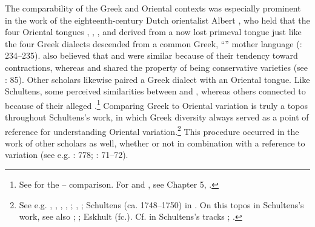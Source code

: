 The comparability of the Greek and Oriental contexts was especially prominent in the work of the eighteenth-century Dutch orientalist Albert \citeauthor{Schultens1739}, who held that the four Oriental tongues , , , and  derived from a now lost primeval tongue just like the four Greek dialects descended from a common Greek, “” mother language (\citeyear{Schultens1739}: 234–235). \citet[\textsc{xcvi}]{Schultens1748} also believed that  and  were similar because of their tendency toward contractions, whereas  and  shared the property of being conservative varieties (see \citealt{Eskhult2015}: 85). Other scholars likewise paired a Greek dialect with an Oriental tongue. Like Schultens, some perceived similarities between  and , whereas others connected  to  because of their alleged .\footnote{See \citet[425--432]{Lakemacher1730} for the – comparison. For  and  , see Chapter 5, .} Comparing Greek to Oriental variation is truly a topos throughout Schultens’s work, in which Greek diversity always served as a point of reference for understanding Oriental variation.\footnote{See e.g. \citet[490]{Schultens1769}, \citet[4]{Schultens1732}, \citet[5]{Schultens1737}, \citet[19--21]{Schultens1738a}, \citet[106--107, stressing that the Oriental and the  contexts were less comparable]{Schultens1738b}; \citet[187]{Schultens1739}, \citet[\textsc{xcvi}]{Schultens1748}; Schultens (ca. 1748–1750) in \citet[§\textsc{xxvii}]{Eskhult_albert_nodate}. On this topos in Schultens’s work, see also \citet[105]{Fuck1955}; \citet[707]{Covington1979}; Eskhult (fc.). Cf. in Schultens’s tracks \citet[5]{Polier1739}; \citet{Groddeck1747}.} This procedure occurred in the work of other scholars as well, whether or not in combination with a reference to  variation (see e.g. \citealt{Bochart1646}: 778; \citealt{Blount1680}: 71–72).

